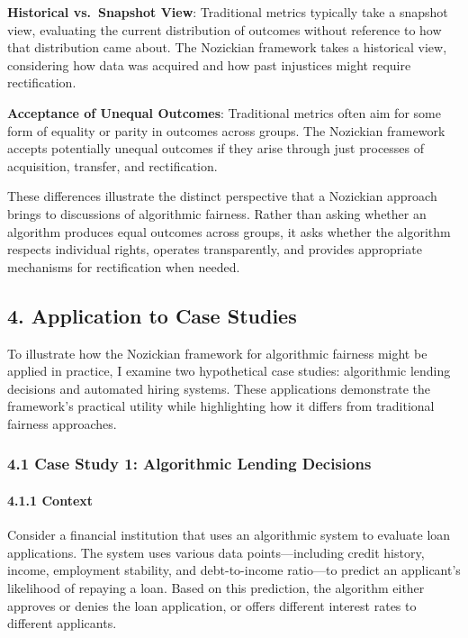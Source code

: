 \textbf{Historical vs.~Snapshot View}: Traditional metrics typically
take a snapshot view, evaluating the current distribution of outcomes
without reference to how that distribution came about. The Nozickian
framework takes a historical view, considering how data was acquired and
how past injustices might require rectification.

\textbf{Acceptance of Unequal Outcomes}: Traditional metrics often aim
for some form of equality or parity in outcomes across groups. The
Nozickian framework accepts potentially unequal outcomes if they arise
through just processes of acquisition, transfer, and rectification.

These differences illustrate the distinct perspective that a Nozickian
approach brings to discussions of algorithmic fairness. Rather than
asking whether an algorithm produces equal outcomes across groups, it
asks whether the algorithm respects individual rights, operates
transparently, and provides appropriate mechanisms for rectification
when needed.

\subsection{4. Application to Case
Studies}\label{application-to-case-studies}

To illustrate how the Nozickian framework for algorithmic fairness might
be applied in practice, I examine two hypothetical case studies:
algorithmic lending decisions and automated hiring systems. These
applications demonstrate the framework's practical utility while
highlighting how it differs from traditional fairness approaches.

\subsubsection{4.1 Case Study 1: Algorithmic Lending
Decisions}\label{case-study-1-algorithmic-lending-decisions}

\paragraph{4.1.1 Context}\label{context}

Consider a financial institution that uses an algorithmic system to
evaluate loan applications. The system uses various data
points---including credit history, income, employment stability, and
debt-to-income ratio---to predict an applicant's likelihood of repaying
a loan. Based on this prediction, the algorithm either approves or
denies the loan application, or offers different interest rates to
different applicants.

